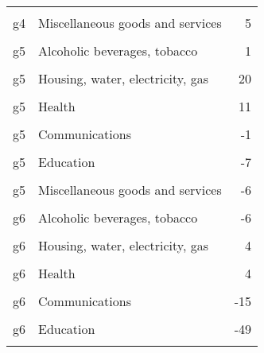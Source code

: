 \documentclass[10pt,a4paper]{report}
\begin{document}
\begin{table}
{\begin{tabular}[t]{llr}
\cellcolor{gray!10}{g4} & \cellcolor{gray!10}{Restaurants and hotels} & \cellcolor{gray!10}{-2}\\
g4 & Miscellaneous goods and services & 5\\
\cellcolor{gray!10}{g5} & \cellcolor{gray!10}{Food and non-alcoholic beverages} & \cellcolor{gray!10}{9}\\
g5 & Alcoholic beverages, tobacco & 1\\
\addlinespace
\cellcolor{gray!10}{g5} & \cellcolor{gray!10}{Clothing and footwear} & \cellcolor{gray!10}{-10}\\
g5 & Housing, water, electricity, gas & 20\\
\cellcolor{gray!10}{g5} & \cellcolor{gray!10}{Furniture, household goods} & \cellcolor{gray!10}{-4}\\
g5 & Health & 11\\
\cellcolor{gray!10}{g5} & \cellcolor{gray!10}{Transport} & \cellcolor{gray!10}{-15}\\
\addlinespace
g5 & Communications & -1\\
\cellcolor{gray!10}{g5} & \cellcolor{gray!10}{Recreation and culture} & \cellcolor{gray!10}{-7}\\
g5 & Education & -7\\
\cellcolor{gray!10}{g5} & \cellcolor{gray!10}{Restaurants and hotels} & \cellcolor{gray!10}{-9}\\
g5 & Miscellaneous goods and services & -6\\
\addlinespace
\cellcolor{gray!10}{g6} & \cellcolor{gray!10}{Food and non-alcoholic beverages} & \cellcolor{gray!10}{-19}\\
g6 & Alcoholic beverages, tobacco & -6\\
\cellcolor{gray!10}{g6} & \cellcolor{gray!10}{Clothing and footwear} & \cellcolor{gray!10}{-19}\\
g6 & Housing, water, electricity, gas & 4\\
\cellcolor{gray!10}{g6} & \cellcolor{gray!10}{Furniture, household goods} & \cellcolor{gray!10}{-13}\\
\addlinespace
g6 & Health & 4\\
\cellcolor{gray!10}{g6} & \cellcolor{gray!10}{Transport} & \cellcolor{gray!10}{-59}\\
g6 & Communications & -15\\
\cellcolor{gray!10}{g6} & \cellcolor{gray!10}{Recreation and culture} & \cellcolor{gray!10}{-26}\\
g6 & Education & -49\\
\addlinespace

\end{tabular}}
\end{table}
\end{document}
